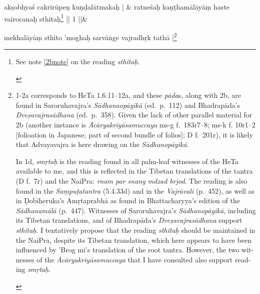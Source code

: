 \documentclass[naipra.tex]{subfiles}
\begin{document}
\begin{sanskrit}
\medskip\versequote
akṣobhyaś cakrirūpeṇ kuṇḍalātmakaḥ | &
ratneśaḥ kaṇṭhamālāyāṃ haste vairocanaḥ sthitaḥ\footnote{
	\begin{english}%
		See note \ref{2bnote} on the reading \emph{sthitaḥ}.
	\end{english}
} || 1 ||\&


\medskip\versequote
mekhalāyāṃ sthito 'moghaḥ sarvāṅge vajradhṛk tathā |\footnote{
	\begin{english}%
		1-2a corresponds to HeTa 1.6.11–12a, and these \emph{pāda}s, along with 2b, are found in Saroruhavajra's \emph{Sādhanaopāyikā} (ed.\ p.\ 112) and Bhadrapāda's \emph{Dveṣavajrasādhana} (ed.\ p.\ 358).
		Given the lack of other parallel material for 2b (another instance is \emph{Ācāryakriyāsamuccaya} ms-g f.\ 183r7–8; ms-k f. 10r1–2 [folioation in Japanese; part of second bundle of folios]; D f.\ 201r), it is likely that Advayavajra is here drawing on the \emph{Sādhanopāyikā}.
	
		In 1d, \emph{smṛtaḥ} is the reading found in all palm-leaf witnesses of the HeTa available to me, and this is reflected in the Tibetan translations of the tantra (D f.\ 7r) and the NaiPra: \emph{rnam par snang mdzad brjod}.
		The reading is also found in the \emph{Saṃpuṭatantra} (5.4.33d) and in the \emph{Vajrāvalī} (p.\ 452), as well as in Ḍobīheruka's {Amṛtaprabhā} as found in Bhattacharyya's edition of the \emph{Sādhanamālā} (p.\ 447).
		Witnesses of Saroruhavajra's \emph{Sādhanopāyikā}, including its Tibetan translations, and of Bhadrapāda's \emph{Dveṣavajrasādhana} support \emph{sthitaḥ}.
		I tentatively propose that the reading \emph{sthitaḥ} should be maintained in the NaiPra, despite its Tibetan translation, which here appears to have been influenced by 'Brog mi's translation of the root tantra.
		However, the two witnesses of the \emph{Ācāryakriyāsamuccaya} that I have consulted also support reading \emph{smṛtaḥ}.


\end{english}}
\end{sanskrit}
\end{document}
